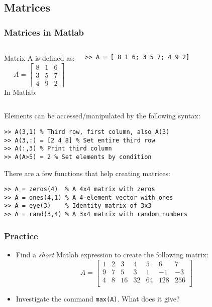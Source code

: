 \subsection*{Matrices}
\begin{frame}[fragile]
  \frametitle{Matrices in Matlab}
  \begin{columns}[T]
    Matrix A is defined as:
    \[
    A = \begin{bmatrix}
      8 & 1 & 6 \\
      3 & 5 & 7 \\
      4 & 9 & 2
    \end{bmatrix}\]
    \pause
    In Matlab:
  \begin{lstlisting}
>> A = [ 8 1 6; 3 5 7; 4 9 2]
  \end{lstlisting}
  \end{columns}
  \pause
  Elements can be accessed/manipulated by the following syntax:
  \begin{lstlisting}
>> A(3,1) % Third row, first column, also A(3)
>> A(3,:) = [2 4 8] % Set entire third row
>> A(:,3) % Print third column
>> A(A>5) = 2 % Set elements by condition
  \end{lstlisting}\pause
  There are a few functions that help creating matrices:
  \begin{lstlisting}
>> A = zeros(4)  % A 4x4 matrix with zeros
>> A = ones(4,1) % A 4-element vector with ones
>> A = eye(3)    % Identity matrix of 3x3
>> A = rand(3,4) % A 3x4 matrix with random numbers
  \end{lstlisting}
\end{frame}

\begin{frame}[fragile]
 \frametitle{Practice}
 \begin{itemize}
  \item Find a \emph{short} Matlab expression to create the following matrix:
  \[
   A = \begin{bmatrix}
        1 & 2 & 3 & 4 & 5 & 6 & 7\\
        9 & 7 & 5 & 3 & 1 & -1 & -3 \\
        4 & 8 & 16 & 32 & 64 & 128 & 256 \\
       \end{bmatrix}
  \]\pause
  \item Investigate the command \lstinline$max(A)$. What does it give?
 \end{itemize}
\end{frame}



